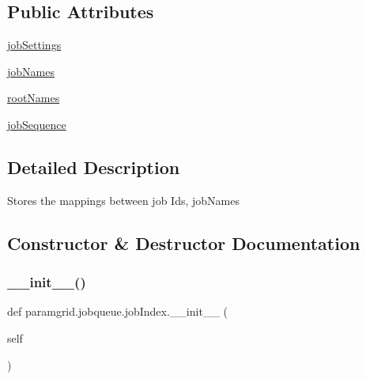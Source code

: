 \subsection*{Public Attributes}
\begin{DoxyCompactItemize}
\item 
\mbox{\hyperlink{classparamgrid_1_1jobqueue_1_1jobIndex_a63a339db1069b4d3bf52358004bc6065}{job\+Settings}}
\item 
\mbox{\hyperlink{classparamgrid_1_1jobqueue_1_1jobIndex_a6a6be19a596302c81292e25f5996809d}{job\+Names}}
\item 
\mbox{\hyperlink{classparamgrid_1_1jobqueue_1_1jobIndex_a5529f13349c46f8673d042fa579fcf64}{root\+Names}}
\item 
\mbox{\hyperlink{classparamgrid_1_1jobqueue_1_1jobIndex_a670a29da7dc24a4bdeae67612c609b27}{job\+Sequence}}
\end{DoxyCompactItemize}


\subsection{Detailed Description}
\begin{DoxyVerb} Stores the mappings between job Ids, jobNames
\end{DoxyVerb}
 

\subsection{Constructor \& Destructor Documentation}
\mbox{\label{classparamgrid_1_1jobqueue_1_1jobIndex_a9146b8ea827ff1fe945bfde30b11f3b6}} 
\subsubsection{\texorpdfstring{\+\_\+\+\_\+init\+\_\+\+\_\+()}{\_\_init\_\_()}}
{\footnotesize\ttfamily def paramgrid.\+jobqueue.\+job\+Index.\+\_\+\+\_\+init\+\_\+\+\_\+ (\begin{DoxyParamCaption}\item[{}]{self }\end{DoxyParamCaption})}



